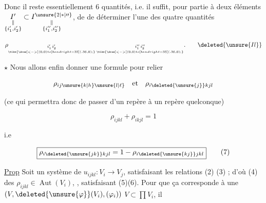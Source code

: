 
Donc il reste essentiellement 6 quantités, i.e.  il suffit, pour    partie à deux éléments $\underset{\substack{\Vert\\\{i'_1,i'_2\}}}{I'}\subset \underset{\substack{\Vert\\\{i''_1,i''_2\}}}{I^{\unsure{2|*|\prime\prime}}}$, de de déterminer l'une des quatre quantités

\[
 \rho_{\underset{\tikz{\draw[<->] (0,0) to[bend right=35] (.36,0);}}{i'_1\,i'_2}\;
 \underset{\tikz{\draw[<->] (0,0) to[bend right=35] (.36,0);}}{i''_1\,i''_2}}.
 \qquad\deleted{\unsure{Il}}
\]

$\star$ Nous allons  enfin donner une formule pour relier

\[
\rho_{ij\unsure{k|h}\unsure{l|\ell}}\quad\text{et}\quad\rho_{i\deleted{\unsure{j}}kjl}
\]

(ce qui permettra donc de passer d'un repère à un repère quelconque)

\[
 \rho_{ijkl}+\rho_{ikjl}=1
\]

i.e

\[
\boxed{\rho_{i\deleted{\unsure{jk}}kjl}=1-\rho_{i\deleted{\unsure{kj}}jkl}}\tag*{(7)}
\]

\margin{[ Faire vérification}

\uline{Prop} Soit un système de $u_{ijkl}:V_i\longrightarrow V_j$, satisfaisant les relations (2) (3) ; d'où (4) des $\rho_{ijkl}\in\operatorname{Aut}(V_i)$, \unsure{)}, satisfaisant (5)(6). Pour que ça corresponde à une   $(V,\deleted{\unsure{\varphi}}(V_i),(\varphi_i))$ \deleted{\unsure{$\subset$}} $V\subset\prod V_i$, il


